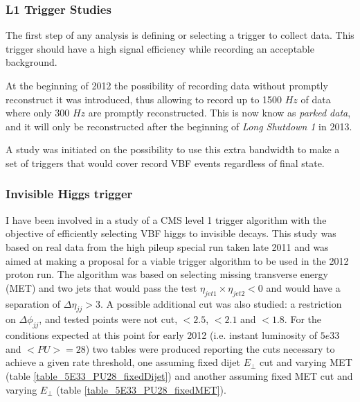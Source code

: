 \documentclass[%
reprint,
amsmath,
amssymb,
aps,
pra,
showkeys
]{revtex4-1}
\begin{document}
\subsubsection{L1 Trigger Studies}

The first step of any analysis is defining or selecting a trigger to collect data. This trigger should have a high
signal efficiency while recording an acceptable background.

At the beginning of 2012 the possibility of recording data without promptly reconstruct it was introduced, thus 
allowing to record up to 1500 $Hz$ of data where only 300 $Hz$ are promptly reconstructed. This is now know as
\textit{parked data}, and it will only be reconstructed after the beginning of \textit{Long Shutdown 1} in 2013.

A study was initiated on the possibility to use this extra bandwidth to make a set of triggers that would cover 
record VBF events regardless of final state. 

\subsubsection{Invisible Higgs trigger}

I have been involved in a study of a CMS level 1 trigger algorithm with the objective of efficiently selecting
VBF higgs to invisible decays. This study was based on real data from the high pileup special run taken late 2011
and was aimed at making a proposal for a viable trigger algorithm to be used in the 2012 proton run.
The algorithm was based on selecting missing transverse energy (MET) and two jets that would pass the test
$\eta_{jet1}\times\eta_{jet2}<0$ and would have a separation of $\Delta\eta_{jj}>3$. A possible additional cut
was also studied: a restriction on $\Delta\phi_{jj}$, and tested points were not cut, $<2.5$, $<2.1$ and $<1.8$. 
For the conditions expected at this point for early 2012 (i.e. instant luminosity of $5e33$ and $<PU>=28$) two tables 
were produced reporting the cuts necessary to achieve a given rate threshold, one assuming fixed dijet $E_\bot$ cut 
and varying MET (table \ref{table_5E33_PU28_fixedDijet}) and another assuming fixed MET cut and varying $E_\bot$ 
(table \ref{table_5E33_PU28_fixedMET}).
\end{document}
